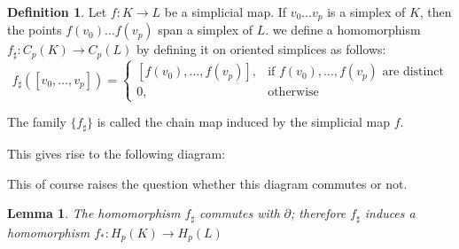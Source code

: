 \documentclass[draft,toc=bib]{scrartcl}
\theoremstyle{plain}
\newtheorem{lemma}[theorem]{Lemma}
\theoremstyle{definition}
\newtheorem	{definition}[theorem]{Definition}
\theoremstyle{remark}
\begin{document}
\begin{definition}
	Let $f: K\to L$ be a simplicial map. If $v_0\dots v_p$ is a simplex of $K$, then the points $f(v_0)\dots f(v_p)$ span a simplex of $L$. we define a homomorphism $f_\sharp: C_p(K)\to C_p(L)$ by defining it on oriented simplices as follows:
	\[
	f_\sharp([v_0,\dots,v_p])=\begin{cases}
	[f(v_0),\dots, f(v_p)],& \text{if } f(v_0),\dots, f(v_p) \text{ are distinct}\\
	0,&\text{otherwise}
	\end{cases}
	\]
	
	The family $\{f_\sharp\}$ is called the chain map induced by the simplicial map $f$.
\end{definition}

This gives rise to the following diagram:

\begin{center}
	
\end{center}

This of course raises the question whether this diagram commutes or not. 
\begin{lemma}
	The homomorphism $f_\sharp$ commutes with $\partial$; therefore $f_\sharp$ induces a homomorphism $f_\ast:H_p(K)\to H_p(L)$
\end{lemma}
\end{document}

